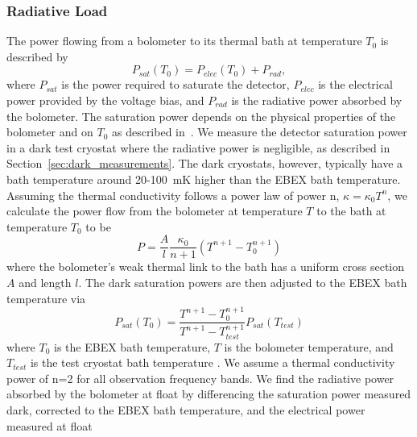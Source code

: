 \documentclass[../EBEXPaper2.tex]{subfiles}
\begin{document}
\subsubsection{Radiative Load}
\label{sec:optical_load}


The power flowing from a bolometer to its thermal bath at temperature $T_0$ is described by 
\begin{equation}
P_{sat} (T_0) = P_{elec} (T_0) + P_{rad},
\label{eq:boloPowerFlow}
\end{equation}
where $P_{sat}$ is the power required to saturate the detector, $P_{elec}$ is the electrical power provided by the voltage bias, and $P_{rad}$ is the radiative power absorbed by the bolometer.
The saturation power depends on the physical properties of the bolometer and on $T_0$ as described in~\cite{irwin_book_2005}. 
We measure the detector saturation power in a dark test cryostat where the radiative power is negligible, as described in Section~\ref{sec:dark_measurements}. %
The dark cryostats, however, typically have a bath temperature around 20-100~mK higher than the \ac{EBEX} bath temperature. 
Assuming the thermal conductivity follows a power law of power n, $\kappa = \kappa_{0} T^{n}$, 
we calculate the power flow from the bolometer at temperature $T$ to the bath at temperature $T_0$ to be
\begin{equation}
P = \frac{A}{l} \frac{\kappa_0}{n+1}(T^{n+1} - T_{0}^{n+1})
\end{equation}
where the bolometer's weak thermal link to the bath has a uniform cross section $A$ and length $l$.
The dark saturation powers are then adjusted to the \ac{EBEX} bath temperature via 
\begin{equation}
P_{sat}(T_0) = \frac{T^{n+1}-T_0^{n+1}}{T^{n+1}-T_{test}^{n+1}} P_{sat}(T_{test})
\end{equation}
where $T_0$ is the \ac{EBEX} bath temperature, $T$ is the bolometer temperature, and $T_{test}$ is the test cryostat bath temperature \citep{hubmayr_thesis}. 
We assume a thermal conductivity power of n=2 for all observation frequency bands.
We find the radiative power absorbed by the bolometer at float by differencing the saturation power measured dark, corrected to the \ac{EBEX} bath temperature, and the electrical power measured at float %
\end{document}
